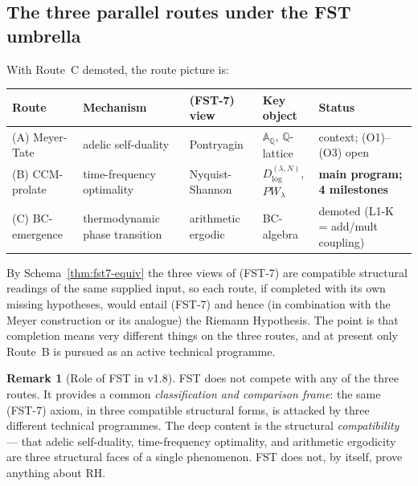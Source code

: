 \documentclass[11pt,a4paper]{article}
\theoremstyle{plain}
\theoremstyle{definition}
\newtheorem{remark}[theorem]{Remark}
\newcommand{\Q}{\mathbb{Q}}
\newcommand{\A}{\mathbb{A}}
\begin{document}
\subsection{The three parallel routes under the FST umbrella}
\label{sec:three-routes}

With Route~C demoted, the route picture is:

\begin{center}
\small
\begin{tabular}{@{}L{0.12\textwidth}L{0.18\textwidth}L{0.18\textwidth}L{0.20\textwidth}L{0.22\textwidth}@{}}
\toprule
\textbf{Route} & \textbf{Mechanism} & \textbf{(FST-7) view} &
\textbf{Key object} & \textbf{Status} \\
\midrule
(A) Meyer-Tate      & adelic self-duality & Pontryagin        &
$\A_\Q$, $\Q$-lattice & context; (O1)--(O3) open \\
(B) CCM-prolate     & time-frequency optimality & Nyquist-Shannon &
$D^{(\lambda,N)}_{\log}$, $PW_\lambda$ & \textbf{main program; 4 milestones} \\
(C) BC-emergence    & thermodynamic phase transition & arithmetic ergodic &
BC-algebra            & demoted (L1-K = add/mult coupling) \\
\bottomrule
\end{tabular}
\end{center}

By Schema~\ref{thm:fst7-equiv} the three views of (FST-7) are
compatible structural readings of the same supplied input, so each
route, if completed with its own missing hypotheses, would entail
(FST-7) and hence (in combination with the Meyer
construction or its analogue) the Riemann Hypothesis.  The point is
that completion means very different things on the three routes, and
at present only Route~B is pursued as an active technical programme.

\begin{remark}[Role of FST in v1.8]\label{rem:fst-role-v07}
FST does not compete with any of the three routes.  It provides a
common \emph{classification and comparison frame}: the same
(FST-7) axiom, in three compatible structural forms, is attacked by
three different technical programmes.  The deep content is the
structural \emph{compatibility} --- that adelic self-duality,
time-frequency optimality, and arithmetic ergodicity are three
structural faces of a single phenomenon.  FST does not, by itself,
prove anything about RH.
\end{remark}

\end{document}
